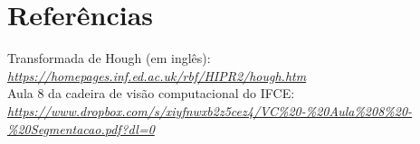 \documentclass[12pt,fleqn]{article}
\begin{document}
\section{Referências}

Transformada de Hough (em inglês): \\
\href{https://homepages.inf.ed.ac.uk/rbf/HIPR2/hough.htm}
{\textit{https://homepages.inf.ed.ac.uk/rbf/HIPR2/hough.htm}} \\

Aula 8 da cadeira de visão computacional do IFCE: \\
\href{https://www.dropbox.com/s/xiyfnwxb2z5cez4/VC\%20-\%20Aula\%208\%20-\%20Segmentacao.pdf?dl=0}{\textit{https://www.dropbox.com/s/xiyfnwxb2z5cez4/VC\%20-\%20Aula\%208\%20-\%20Segmentacao.pdf?dl=0}} \\














\end{document}
